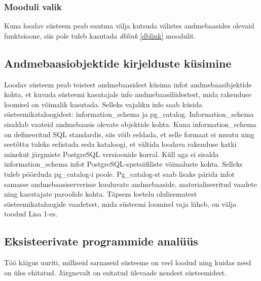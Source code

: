 \documentclass[a4paper,12pt]{article} %
\begin{document}
\subsubsection{Mooduli valik}
Kuna loodav süsteem peab suutma välja kutsuda välistes andmebaasides olevaid funktsioone, siis pole tuleb kasutada \textit{dblink} \ref{dblink} moodulit.

\subsection{Andmebaasiobjektide kirjelduste küsimine}
\label{andmebaasi_objektide_kirjelduste_küsimine}
Loodav süsteem peab teistest andmebaasidest küsima infot andmebaasibjektide kohta, et kuvada süsteemi kasutajale info andmebaasiliidestest, mida rakenduse loomisel on võimalik kasutada. Selleks vajaliku info saab küsida süsteemikataloogidest: information\_schema ja pg\_catalog.
Information\_schema sisaldab vaateid andmebaasis olevate objektide kohta. Kuna information\_schema on defineeritud SQL standardis, siis võib eeldada, et selle formaat ei muutu ning seetõttu tuleks eelistada seda kataloogi, et vältida loodava rakenduse katki minekut  järgmiste PostgreSQL versioonide korral. \cite{PostgreSQLInformationSchema} Küll aga ei sisalda information\_schema infot PostgreSQL-spetsiifiliste võimaluste kohta. Selleks tuleb pöörduda pg\_catalog-i poole. Pg\_catalog-st saab lisaks pärida infot samasse andmebaasiserverisse kuuluvate andmebaaside, materialiseeritud vaadete ning kasutajate paroolide kohta. \cite{PostgreSQLSystemCatalogs} Täpsem loetelu olulisematest süsteemikataloogide vaadetest, mida süsteemi loomisel vaja läheb, on välja toodud Lisa 1-es.

\subsection{Eksisteerivate programmide analüüs}
Töö käigus uuriti, milliseid sarnaseid süsteeme on veel loodud ning kuidas need on üles ehitatud. Järgnevalt on esitatud ülevaade nendest süsteemidest.
\end{document}
